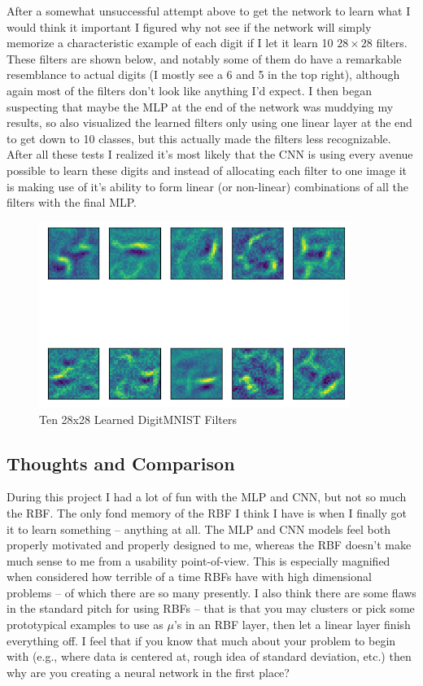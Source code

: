 \documentclass[12pt, twoside]{report}
\begin{document}
After a somewhat unsuccessful attempt above to get the network to learn what I would think it important
I figured why not see if the network will simply memorize a characteristic example of each digit if 
I let it learn 10 $28 \times 28$ filters. These filters are shown below, and notably some of them do have
a remarkable resemblance to actual digits (I mostly see a 6 and 5 in the top right), although again most
of the filters don't look like anything I'd expect. I then began suspecting that maybe the MLP at the end
of the network was muddying my results, so also visualized the learned filters only using one linear
layer at the end to get down to 10 classes, but this actually made the filters less recognizable.
After all these tests I realized it's most likely that the CNN is using every avenue possible
to learn these digits and instead of allocating each filter to one image it is making use
of it's ability to form linear (or non-linear) combinations of all the filters with the final MLP.

\begin{figure}[H]
    \centering
    \includegraphics[width=0.9\textwidth]{figures/10filters2828.png}
    \caption*{Ten 28x28 Learned DigitMNIST Filters}
\end{figure}

\subsection{Thoughts and Comparison}

During this project I had a lot of fun with the MLP and CNN, but not so much the RBF.
The only fond memory of the RBF I think I have is when I finally got it to learn something –
anything at all. The MLP and CNN models feel both properly motivated and properly designed to me,
whereas the RBF doesn't make much sense to me from a usability point-of-view.
This is especially magnified when considered how terrible of a time RBFs have with high dimensional
problems – of which there are so many presently. I also think there are some flaws in the standard 
pitch for using RBFs – that is that you may clusters or pick some prototypical examples to use as $\mu$'s in
an RBF layer, then let a linear layer finish everything off. I feel that if you know that much about your 
problem to begin with (e.g., where data is centered at, rough idea of standard deviation, etc.) then
why are you creating a neural network in the first place?
\end{document}

